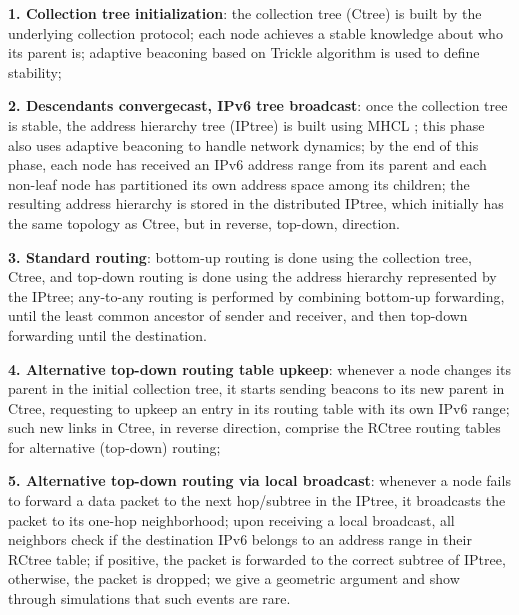 \noindent \textbf{1. Collection tree initialization}: the
  collection tree (Ctree) is built by the underlying collection protocol; each
  node achieves a stable knowledge about who its parent is; adaptive beaconing
  based on Trickle algorithm \cite{Levis:2004} is used to define stability;
  
\noindent  \textbf{2. Descendants convergecast,
  IPv6 tree broadcast}: once the collection tree
  is stable, the address hierarchy tree (IPtree) is built using MHCL
  \cite{mhcl}; this phase also uses adaptive beaconing to handle network
  dynamics; by the end of this phase, each node has received an IPv6 address
  range from its parent and each non-leaf node has partitioned its own address 
	space among its children; the resulting address
  hierarchy is stored in the distributed IPtree, which initially has the same
  topology as Ctree, but in reverse, top-down, direction.
  
\noindent  \textbf{3. Standard routing}: bottom-up routing is done
  using the collection tree, Ctree, and top-down routing is done using the
  address hierarchy represented by the IPtree; any-to-any routing is performed by combining
  bottom-up forwarding, until the least common ancestor of sender and
  receiver, and then top-down forwarding until the destination.
  
\noindent  \textbf{4. Alternative top-down routing table upkeep}: whenever a
node changes its parent in the initial collection tree, it starts sending
  beacons to its new parent in Ctree, requesting to upkeep an entry in
  its routing table with its own IPv6 range; such new links in
  Ctree, in reverse direction, comprise the RCtree routing tables for
  alternative (top-down) routing;
  
\noindent  \textbf{5. Alternative top-down routing via local broadcast}:
whenever a node fails to forward a data packet to the next hop/subtree in the IPtree, it
  broadcasts the packet to its one-hop neighborhood; upon receiving a local
  broadcast, all neighbors check if the destination IPv6 belongs to an address
  range in their RCtree table; if positive, the packet is forwarded to the
  correct subtree of IPtree, otherwise, the packet is dropped; we give a
  geometric argument and show through simulations that such events are rare.


